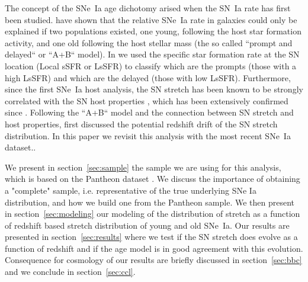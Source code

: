 \documentclass[]{aa} %
\begin{document}

The concept of the SNe~Ia age dichotomy arised when the SN~Ia rate has first
been studied. \cite{mannucci2005, scannapieco2005, sullivan2006, aubourg2008}
have shown that the relative SNe~Ia rate in galaxies could only be explained if
two populations existed, one young, following the host star formation activity,
and one old following the host stellar mass (the so called “prompt and delayed“
or “A+B“ model). In \cite{rigault2018} we used the specific star formation rate
at the SN location (Local sSFR or LsSFR) to classify which are the prompts
(those with a high LsSFR) and which are the delayed (those with low LsSFR).
Furthermore, since the first SNe~Ia host analysis, the SN stretch has been known
to be strongly correlated with the SN host properties \citep{hamuy1996,
hamuy2000}, which has been extensively confirmed since \citep[e.g.][]{neill2009,
sullivan2010, lampeitl2010, kelly2010, gupta2011, dandrea2011, childress2013,
rigault2013, pan2014}. Following the “A+B“ model and the connection between SN
stretch and host properties, \cite{howell2007} first discussed the potential
redshift drift of the SN stretch distribution. In this paper we revisit this
analysis with the most recent SNe~Ia dataset..

We present in section~\ref{sec:sample} the sample we are using for this
analysis, which is based on the Pantheon dataset \citep{scolnic2018a}. We
discuss the importance of obtaining a "complete" sample, i.e. representative of
the true underlying SNe Ia distribution, and how we build one from the Pantheon
sample.  We then present in section~\ref{sec:modeling} our modeling of the
distribution of stretch as a function of redshift based stretch distribution of
young and old SNe~Ia. Our results are presented in section~\ref{sec:results}
where we test if the SN stretch does evolve as a function of redshift and if the
age model is in good agreement with this evolution. Consequence for cosmology of
our results are briefly discussed in section~\ref{sec:bbc} and we conclude in
section~\ref{sec:ccl}.
\end{document}
